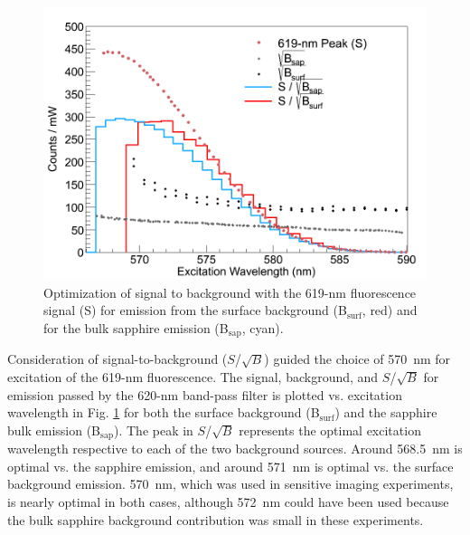 \begin{figure} %
        \centering
                \includegraphics[width=.7\textwidth]{figures/S_to_B_both.png}
                \caption{Optimization of signal to background with the 619-nm fluorescence signal (S) for emission from the surface background (B$_{\text{surf}}$, red) and for the bulk sapphire emission (B$_{\text{sap}}$, cyan).}
        \label{fig:StoB}
\end{figure}

Consideration of signal-to-background ($S$/$\sqrt{B}$) guided the choice of 570~nm for excitation of the 619-nm fluorescence.  The signal, background, and $S$/$\sqrt{B}$ for emission passed by the 620-nm band-pass filter is plotted vs. excitation wavelength in Fig. \ref{fig:StoB} for both the surface background (B$_{\text{surf}}$) and the sapphire bulk emission (B$_{\text{sap}}$).  The peak in $S$/$\sqrt{B}$ represents the optimal excitation wavelength respective to each of the two background sources.  Around 568.5~nm is optimal vs. the sapphire emission, and around 571~nm is optimal vs. the surface background emission. 570~nm, which was used in sensitive imaging experiments, is nearly optimal in both cases, although 572~nm could have been used because the bulk sapphire background contribution was small in these experiments.
